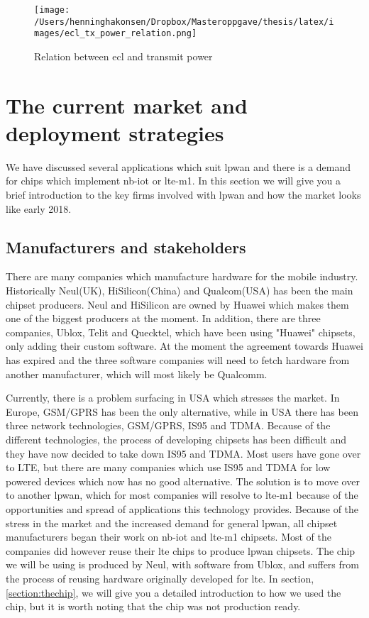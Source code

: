 \documentclass[USenglish]{ifimaster}  %
\begin{document}

\begin{figure}[H]
  \centering\texttt{[image: /Users/henninghakonsen/Dropbox/Masteroppgave/thesis/latex/images/ecl\_tx\_power\_relation.png]}
  \caption[\acrshort{ecl} and transmit power relation]{Relation between \acrshort{ecl} and transmit power}
  \label{figure:ecl_dbm}
\end{figure}

\section{The current market and deployment strategies} \label{section:market}
We have discussed several applications which suit \acrshort{lpwan} and there is a demand for chips which implement \acrshort{nb-iot} or \acrshort{lte-m1}. In this section we will give you a brief introduction to the key firms involved with \acrshort{lpwan} and how the market looks like early 2018.

\subsection{Manufacturers and stakeholders} \label{ssection:manufacture}
There are many companies which manufacture hardware for the mobile industry. Historically Neul(UK), HiSilicon(China) and Qualcom(USA) has been the main chipset producers. Neul and HiSilicon are owned by Huawei which makes them one of the biggest producers at the moment. In addition, there are three companies, Ublox, Telit and Quecktel, which have been using "Huawei" chipsets, only adding their custom software. At the moment the agreement towards Huawei has expired and the three software companies will need to fetch hardware from another manufacturer, which will most likely be Qualcomm.

Currently, there is a problem surfacing in USA which stresses the market. In Europe, GSM/GPRS has been the only alternative, while in USA there has been three network technologies, GSM/GPRS, IS95 and TDMA. Because of the different technologies, the process of developing chipsets has been difficult and they have now decided to take down IS95 and TDMA. Most users have gone over to LTE, but there are many companies which use IS95 and TDMA for low powered devices which now has no good alternative. The solution is to move over to another \acrshort{lpwan}, which for most companies will resolve to \acrshort{lte-m1} because of the opportunities and spread of applications this technology provides.
Because of the stress in the market and the increased demand for general \acrshort{lpwan}, all chipset manufacturers began their work on \acrshort{nb-iot} and \acrshort{lte-m1} chipsets. Most of the companies did however reuse their \acrshort{lte} chips to produce \acrshort{lpwan} chipsets. The chip we will be using is produced by Neul, with software from Ublox, and suffers from the process of reusing hardware originally developed for \acrshort{lte}. In section, \vref{section:thechip}, we will give you a detailed introduction to how we used the chip, but it is worth noting that the chip was not production ready.
\end{document}
